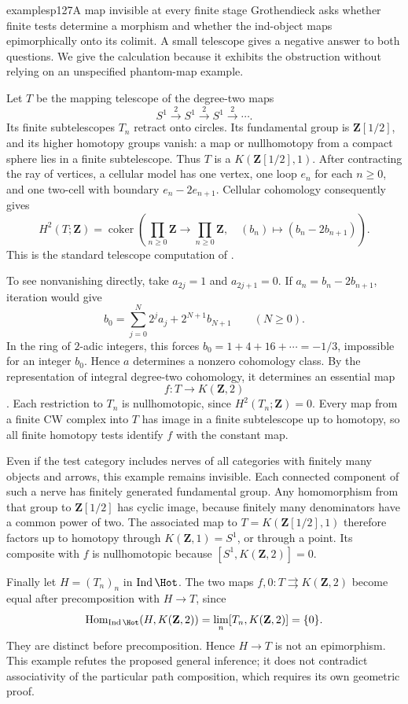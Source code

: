 \begin{dcomment}{examples}{p127}{A map invisible at every finite stage}
Grothendieck asks whether finite tests determine a morphism and whether the ind-object maps epimorphically onto its colimit. A small telescope gives a negative answer to both questions. We give the calculation because it exhibits the obstruction without relying on an unspecified phantom-map example.

Let $T$ be the mapping telescope of the degree-two maps
\[
 S^1\xrightarrow{2}S^1\xrightarrow{2}S^1\xrightarrow{2}\cdots.
\]
Its finite subtelescopes $T_n$ retract onto circles. Its fundamental group is $\mathbf Z[1/2]$, and its higher homotopy groups vanish: a map or nullhomotopy from a compact sphere lies in a finite subtelescope. Thus $T$ is a $K(\mathbf Z[1/2],1)$. After contracting the ray of vertices, a cellular model has one vertex, one loop $e_n$ for each $n\geq0$, and one two-cell with boundary $e_n-2e_{n+1}$. Cellular cohomology consequently gives
\[
 H^2(T;\mathbf Z)=\operatorname{coker}\left(
 \prod_{n\geq0}\mathbf Z\longrightarrow\prod_{n\geq0}\mathbf Z,
 \quad(b_n)\longmapsto(b_n-2b_{n+1})\right).
\]
This is the standard telescope computation of \citet[Examples~3F.7 and~3F.9]{Hatcher2002}.

To see nonvanishing directly, take $a_{2j}=1$ and $a_{2j+1}=0$. If $a_n=b_n-2b_{n+1}$, iteration would give
\[
 b_0=\sum_{j=0}^{N}2^ja_j+2^{N+1}b_{N+1}
 \qquad(N\geq0).
\]
In the ring of $2$-adic integers, this forces
$b_0=1+4+16+\cdots=-1/3$, impossible for an integer $b_0$. Hence $a$ determines a nonzero cohomology class. By the representation of integral degree-two cohomology, it determines an essential map
\[
 f:T\longrightarrow K(\mathbf Z,2)
\]
\citep[Theorem~4.57]{Hatcher2002}. Each restriction to $T_n$ is nullhomotopic, since $H^2(T_n;\mathbf Z)=0$. Every map from a finite CW complex into $T$ has image in a finite subtelescope up to homotopy, so all finite homotopy tests identify $f$ with the constant map.

Even if the test category includes nerves of all categories with finitely many objects and arrows, this example remains invisible. Each connected component of such a nerve has finitely generated fundamental group. Any homomorphism from that group to $\mathbf Z[1/2]$ has cyclic image, because finitely many denominators have a common power of two. The associated map to $T=K(\mathbf Z[1/2],1)$ therefore factors up to homotopy through $K(\mathbf Z,1)=S^1$, or through a point. Its composite with $f$ is nullhomotopic because $[S^1,K(\mathbf Z,2)]=0$.

Finally let $H=(T_n)_n$ in $\mathrm{Ind}\,\Hot$. The two maps $f,0:T\rightrightarrows K(\mathbf Z,2)$ become equal after precomposition with $H\to T$, since
\[
 \mathrm{Hom}_{\mathrm{Ind}\,\Hot}(H,K(\mathbf Z,2))
      =\mathop{\rm lim}_n[T_n,K(\mathbf Z,2)]=\{0\}.
\]
They are distinct before precomposition. Hence $H\to T$ is not an epimorphism. This example refutes the proposed general inference; it does not contradict associativity of the particular path composition, which requires its own geometric proof.
\end{dcomment}

